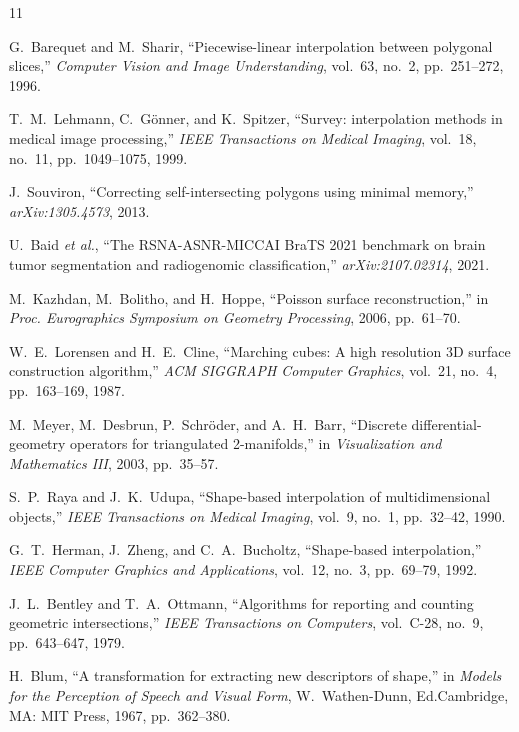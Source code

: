 \documentclass[conference]{IEEEtran}
\begin{document}
\begin{thebibliography}{11}

 G.~Barequet and M.~Sharir,
``Piecewise-linear interpolation between polygonal slices,''
\textit{Computer Vision and Image Understanding},
vol.~63, no.~2, pp.~251--272, 1996.

 T.~M.~Lehmann, C.~G\"onner, and K.~Spitzer,
``Survey: interpolation methods in medical image processing,''
\textit{IEEE Transactions on Medical Imaging}, vol.~18, no.~11,
pp.~1049--1075, 1999.

 J.~Souviron, ``Correcting
self-intersecting polygons using minimal memory,''
\textit{arXiv:1305.4573}, 2013.

 U.~Baid \textit{et al.}, ``The RSNA-ASNR-MICCAI
BraTS 2021 benchmark on brain tumor segmentation and
radiogenomic classification,'' \textit{arXiv:2107.02314}, 2021.

 M.~Kazhdan, M.~Bolitho, and H.~Hoppe,
``Poisson surface reconstruction,'' in \textit{Proc. Eurographics
Symposium on Geometry Processing}, 2006, pp.~61--70.

 W.~E.~Lorensen and H.~E.~Cline, ``Marching cubes:
A high resolution 3D surface construction algorithm,'' \textit{ACM SIGGRAPH
Computer Graphics}, vol.~21, no.~4, pp.~163--169, 1987.

 M.~Meyer, M.~Desbrun, P.~Schr\"oder, and A.~H.~Barr,
``Discrete differential-geometry operators for triangulated 2-manifolds,''
in \textit{Visualization and Mathematics III}, 2003, pp.~35--57.

 S.~P.~Raya and J.~K.~Udupa, ``Shape-based
interpolation of multidimensional objects,'' \textit{IEEE Transactions on
Medical Imaging}, vol.~9, no.~1, pp.~32--42, 1990.

 G.~T.~Herman, J.~Zheng, and C.~A.~Bucholtz,
``Shape-based interpolation,'' \textit{IEEE Computer Graphics and
Applications}, vol.~12, no.~3, pp.~69--79, 1992.

 J.~L.~Bentley and T.~A.~Ottmann, ``Algorithms
for reporting and counting geometric intersections,'' \textit{IEEE
Transactions on Computers}, vol.~C-28, no.~9, pp.~643--647, 1979.

 H.~Blum, ``A transformation for extracting new
descriptors of shape,'' in \textit{Models for the Perception of Speech
and Visual Form}, W.~Wathen-Dunn, Ed.\quad Cambridge, MA: MIT Press,
1967, pp.~362--380.

\end{thebibliography}
\end{document}
